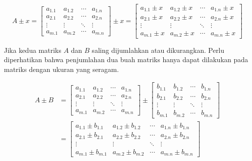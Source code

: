 \documentclass[]{book}
\theoremstyle{definition}
\theoremstyle{definition}
\theoremstyle{definition}
\theoremstyle{remark}
\begin{document}
\begin{equation}
A \pm x = \begin{bmatrix}
       a_{1.1} & a_{1.2} &\cdots& a_{1.n}           \\[0.3em]
       a_{2.1} & a_{2.2} &\cdots& a_{2.n}           \\[0.3em]
       \vdots  & \vdots  &\ddots& \vdots            \\[0.3em]
       a_{m.1} & a_{m.2} &\cdots& a_{m.n}
     \end{bmatrix}
\pm x = \begin{bmatrix}
      a_{1.1}\pm x & a_{1.2}\pm x &\cdots& a_{1.n}\pm x           \\[0.3em]
      a_{2.1}\pm x & a_{2.2}\pm x &\cdots& a_{2.n}\pm x           \\[0.3em]
      \vdots  & \vdots  &\ddots& \vdots            \\[0.3em]
      a_{m.1}\pm x & a_{m.2}\pm x &\cdots& a_{m.n}\pm x
     \end{bmatrix}
  \label{eq:addmatrik}
\end{equation}

Jika kedua matriks \(A\) dan \(B\) saling dijumlahkan atau dikurangkan. Perlu diperhatikan bahwa penjumlahan dua buah matriks hanya dapat dilakukan pada matriks dengan ukuran yang seragam.

\begin{equation}
\begin{split}
A \pm B & = \begin{bmatrix}
       a_{1.1} & a_{1.2} &\cdots& a_{1.n}           \\[0.3em]
       a_{2.1} & a_{2.2} &\cdots& a_{2.n}           \\[0.3em]
       \vdots  & \vdots  &\ddots& \vdots            \\[0.3em]
       a_{m.1} & a_{m.2} &\cdots& a_{m.n}
     \end{bmatrix}
\pm \begin{bmatrix}
      b_{1.1} & b_{1.2} &\cdots& b_{1.n}           \\[0.3em]
      b_{2.1} & b_{2.2} &\cdots& b_{2.n}           \\[0.3em]
      \vdots  & \vdots  &\ddots& \vdots            \\[0.3em]
      b_{m.1} & b_{m.2} &\cdots& b_{m.n}
     \end{bmatrix} \\
& = \begin{bmatrix}
       a_{1.1}\pm b_{1.1} & a_{1.2}\pm b_{1.2} &\cdots& a_{1.n}\pm b_{1.n}           \\[0.3em]
       a_{2.1}\pm b_{2.1} & a_{2.2}\pm b_{2.2} &\cdots& a_{2.n}\pm b_{2.n}           \\[0.3em]
       \vdots  & \vdots  &\ddots& \vdots            \\[0.3em]
       a_{m.1}\pm b_{m.1} & a_{m.2}\pm b_{m.2} &\cdots& a_{m.n}\pm b_{m.n}
     \end{bmatrix}
\end{split}
  \label{eq:addmatrik2}
\end{equation}
\end{document}
